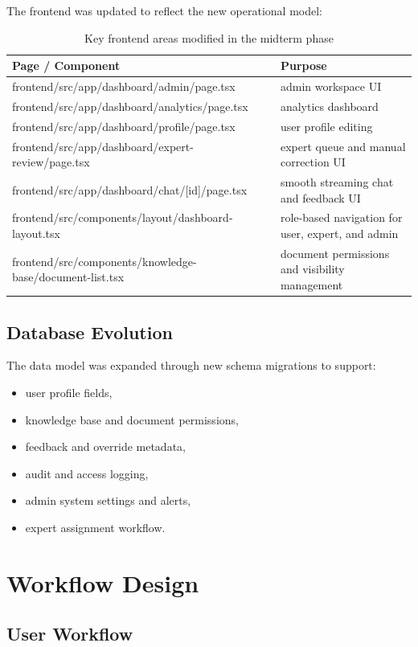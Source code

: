 \documentclass[12pt,a4paper]{report}
\begin{document}
The frontend was updated to reflect the new operational model:
\begin{table}[H]
\centering
\begin{tabularx}{\textwidth}{>{\ttfamily}l X}
\toprule
Page / Component & Purpose \\
\midrule
frontend/src/app/dashboard/admin/page.tsx & admin workspace UI \\
frontend/src/app/dashboard/analytics/page.tsx & analytics dashboard \\
frontend/src/app/dashboard/profile/page.tsx & user profile editing \\
frontend/src/app/dashboard/expert-review/page.tsx & expert queue and manual correction UI \\
frontend/src/app/dashboard/chat/[id]/page.tsx & smooth streaming chat and feedback UI \\
frontend/src/components/layout/dashboard-layout.tsx & role-based navigation for user, expert, and admin \\
frontend/src/components/knowledge-base/document-list.tsx & document permissions and visibility management \\
\bottomrule
\end{tabularx}
\caption{Key frontend areas modified in the midterm phase}
\end{table}

\section{Database Evolution}

The data model was expanded through new schema migrations to support:
\begin{itemize}[leftmargin=1.5em]
\item user profile fields,
\item knowledge base and document permissions,
\item feedback and override metadata,
\item audit and access logging,
\item admin system settings and alerts,
\item expert assignment workflow.
\end{itemize}

\chapter{Workflow Design}

\section{User Workflow}
\end{document}

